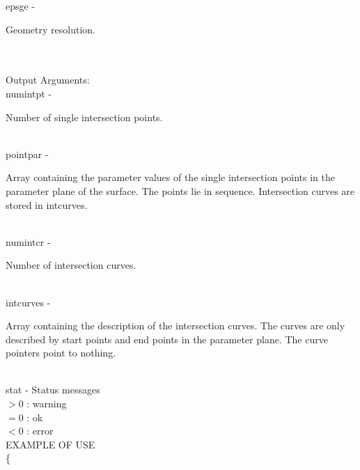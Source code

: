         \>\>    {\fov epsge}    \> - \> \begin{minipg2}
                                Geometry resolution.
                                \end{minipg2}\\
\\
        \>Output Arguments:\\
        \>\>    {\fov numintpt} \> - \> \begin{minipg2}
                                Number of single intersection points.
                                \end{minipg2}\\
        \>\>    {\fov pointpar} \> - \> \begin{minipg2}
                                Array containing the parameter values of the
                                single intersection points in the parameter plane
                                of the surface. The points lie in sequence.
                                Intersection curves are stored in intcurves.
                                \end{minipg2}\\[0.8ex]
        \>\>    {\fov numintcr} \> - \> \begin{minipg2}
                                Number of intersection curves.
                                \end{minipg2}\\
        \>\>    {\fov intcurves}        \> - \> \begin{minipg2}
                                Array containing the description of the intersection
                                curves. The curves are only described by
                                start points and end points in
                                the parameter plane. The curve pointers point to
                                nothing.

                                \end{minipg2}\\[0.3ex]
        \>\>    {\fov stat}     \> - \> Status messages\\
                \>\>\>\>\>              $> 0$   : warning\\
                \>\>\>\>\>              $= 0$   : ok\\
                \>\>\>\>\>              $< 0$   : error\\
\newpagetabs
EXAMPLE OF USE\\
                \>      \{ \\
